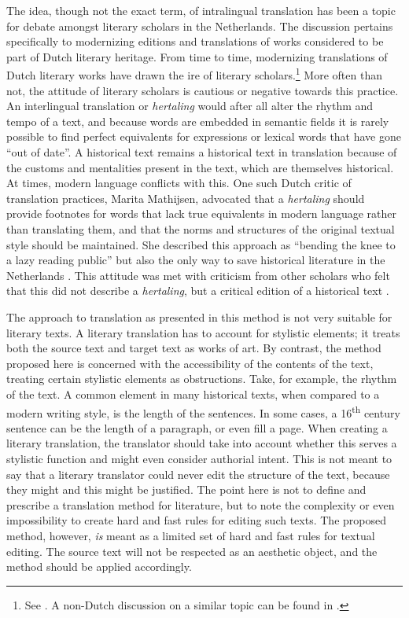 \begin{paper}
The idea, though not the exact term, of intralingual translation has
been a topic for debate amongst literary scholars in the Netherlands.
The discussion pertains specifically to modernizing editions and
translations of works considered to be part of Dutch literary heritage.
From time to time, modernizing translations of Dutch literary works have
drawn the ire of literary scholars.\footnote{See \citealt{van_oostendorp_handen_2013,jansen_hom_2007,kuipers_pinkeltje_1996}. A non-Dutch discussion on a similar topic can be found in \citealt{taylor_translation_1996}.} More often than not, the attitude of literary
scholars is cautious or negative towards this practice. An interlingual
translation or \emph{hertaling} would after all alter the rhythm and
tempo of a text, and because words are embedded in semantic fields it is
rarely possible to find perfect equivalents for expressions or lexical
words that have gone ``out of date''. A historical text remains a
historical text in translation because of the customs and mentalities
present in the text, which are themselves historical. At times, modern
language conflicts with this. One such Dutch critic of translation
practices, Marita Mathijsen, advocated that a \emph{hertaling} should
provide footnotes for words that lack true equivalents in modern
language rather than translating them, and that the norms and structures
of the original textual style should be maintained. She described this
approach as ``bending the knee to a lazy reading public'' but also the
only way to save historical literature in the Netherlands \citep[129]{mathijsen_een_2003}. This attitude was met with criticism from other scholars who
felt that this did not describe a \emph{hertaling}, but a critical
edition of a historical text \citep[247--57]{van_strien_enig_2004}.

The approach to translation as presented in this method is not very
suitable for literary texts. A literary translation has to account for
stylistic elements; it treats both the source text and target text as
works of art. By contrast, the method proposed here is concerned with
the accessibility of the contents of the text, treating certain
stylistic elements as obstructions. Take, for example, the rhythm of the
text. A common element in many historical texts, when compared to a
modern writing style, is the length of the sentences. In some cases, a
16\textsuperscript{th} century sentence can be the length of a paragraph, or even fill a
page. When creating a literary translation, the translator should take
into account whether this serves a stylistic function and might even
consider authorial intent. This is not meant to say that a literary
translator could never edit the structure of the text, because they
might and this might be justified. The point here is not to define and
prescribe a translation method for literature, but to note the
complexity or even impossibility to create hard and fast rules for
editing such texts. The proposed method, however, \emph{is} meant as a
limited set of hard and fast rules for textual editing. The source text
will not be respected as an aesthetic object, and the method should be
applied accordingly.


\end{paper}
